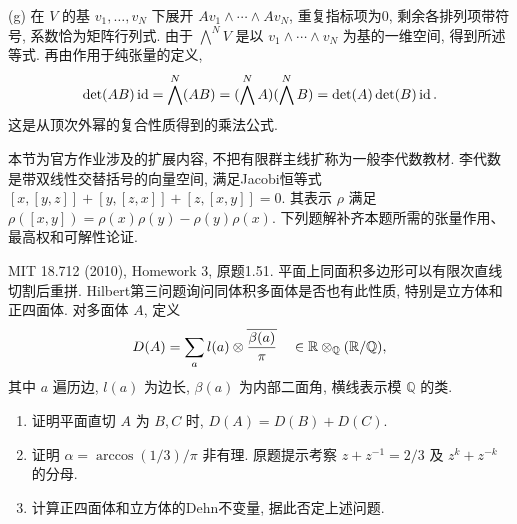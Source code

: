 \begin{solution}
(g) 在 $V$ 的基 $v_1,\ldots,v_N$ 下展开 $Av_1\wedge\cdots\wedge Av_N$, 重复指标项为0, 剩余各排列项带符号, 系数恰为矩阵行列式. 由于 $\bigwedge^NV$ 是以 $v_1\wedge\cdots\wedge v_N$ 为基的一维空间, 得到所述等式. 再由作用于纯张量的定义,
\[
\det(AB)\operatorname{id}=\bigwedge^N(AB)
=(\bigwedge^NA)(\bigwedge^NB)=\det(A)\det(B)\operatorname{id}.
\]
这是从顶次外幂的复合性质得到的乘法公式.
\end{solution}


本节为官方作业涉及的扩展内容, 不把有限群主线扩称为一般李代数教材. 李代数是带双线性交替括号的向量空间, 满足Jacobi恒等式 $[x,[y,z]]+[y,[z,x]]+[z,[x,y]]=0$. 其表示 $\rho$ 满足 $\rho([x,y])=\rho(x)\rho(y)-\rho(y)\rho(x)$. 下列题解补齐本题所需的张量作用、最高权和可解性论证.

\begin{exercise}\label{hw:1.51}
MIT 18.712 (2010), Homework 3, 原题1.51. 平面上同面积多边形可以有限次直线切割后重拼. Hilbert第三问题询问同体积多面体是否也有此性质, 特别是立方体和正四面体. 对多面体 $A$, 定义
\[
D(A)=\sum_a l(a)\otimes\overline{\frac{\beta(a)}\pi}
\quad\in\mathbb R\otimes_{\mathbb Q}(\mathbb R/\mathbb Q),
\]
其中 $a$ 遍历边, $l(a)$ 为边长, $\beta(a)$ 为内部二面角, 横线表示模 $\mathbb Q$ 的类.
\begin{enumerate}[label=(\alph*)]
\item 证明平面直切 $A$ 为 $B,C$ 时, $D(A)=D(B)+D(C)$.
\item 证明 $\alpha=\arccos(1/3)/\pi$ 非有理. 原题提示考察 $z+z^{-1}=2/3$ 及 $z^k+z^{-k}$ 的分母.
\item 计算正四面体和立方体的Dehn不变量, 据此否定上述问题.
\end{enumerate}
\end{exercise}
